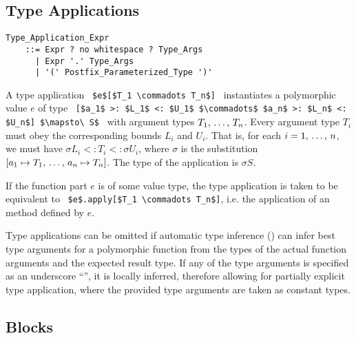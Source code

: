 \subsection{Type Applications}
\label{sec:type-applications}

\grammar\begin{lstlisting}[deletekeywords={no}]
Type_Application_Expr 
    ::= Expr ? no whitespace ? Type_Args
      | Expr '.' Type_Args
      | '(' Postfix_Parameterized_Type ')'
\end{lstlisting}


A type application ~\lstinline!$e$[$T_1 \commadots T_n$]!~ instantiates a polymorphic value $e$ of type ~\lstinline![$a_1$ >: $L_1$ <: $U_1$ $\commadots$ $a_n$ >: $L_n$ <: $U_n$] $\mapsto\ S$!~ with argument types $T_1 ,\, \ldots ,\, T_n$. Every argument type $T_i$ must obey the corresponding bounds $L_i$ and $U_i$. That is, for each $i = 1 ,\, \ldots ,\, n$, we must have $\sigma L_i <: T_i <: \sigma U_i$, where $\sigma$ is the substitution $[a_1 \mapsto T_1 ,\, \ldots ,\, a_n \mapsto T_n]$. The type of the application is $\sigma S$. 

If the function part $e$ is of some value type, the type application is taken to be equivalent to ~\lstinline!$e$.apply[$T_1 \commadots T_n$]!, i.e. the application of an  method defined by $e$. 

Type applications can be omitted if automatic type inference () can infer best type arguments for a polymorphic function from the types of the actual function arguments and the expected result type. If any of the type arguments is specified as an underscore ``\code{_}'', it is locally inferred, therefore allowing for partially explicit type application, where the provided type arguments are taken as constant types. 





\subsection{Blocks}
\label{sec:blocks}

